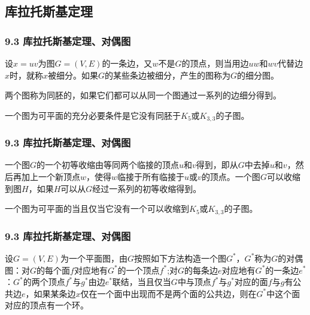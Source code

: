 \documentclass{beamer}
\begin{document}
\begin{CJK}{UTF8}{gbsn}
\section{库拉托斯基定理}
\begin{frame}
  \frametitle{9.3 库拉托斯基定理、对偶图}
  \begin{Def}
    设$x=uv$为图$G=(V,E)$的一条边，又$w$不是$G$的顶点，则当用边$uw$和$wv$代替边$x$时，就称$x$被细分。如果$G$的某些条边被细分，产生的图称为$G$的细分图。
  \end{Def}
  \begin{Def}
    两个图称为同胚的，如果它们都可以从同一个图通过一系列的边细分得到。
  \end{Def}
  \begin{Thm}
    一个图为可平面的充分必要条件是它没有同胚于$K_5$或$K_{3,3}$的子图。
  \end{Thm}
\end{frame}
\begin{frame}
  \frametitle{9.3 库拉托斯基定理、对偶图}
  \begin{Def}
    一个图$G$的一个初等收缩由等同两个临接的顶点$u$和$v$得到，即从$G$中去掉$u$和$v$，然后再加上一个新顶点$w$，使得$w$临接于所有临接于$u$或$v$的顶点。一个图$G$可以收缩到图$H$，如果$H$可以从$G$经过一系列的初等收缩得到。
  \end{Def}
  \begin{Thm}
    一个图为可平面的当且仅当它没有一个可以收缩到$K_5$或$K_{3,3}$的子图。
  \end{Thm}
\end{frame}
\begin{frame}
  \frametitle{9.3 库拉托斯基定理、对偶图}
  \begin{Def}
    设$G=(V,E)$为一个平面图，由$G$按照如下方法构造一个图$G^*$，$G^*$称为$G$的对偶图：对$G$的每个面$f$对应地有$G^*$的一个顶点$f^*$;对$G$的每条边$e$对应地有$G^*$的一条边$e^*$：$G^*$的两个顶点$f^*$与$g^*$由边$e^*$联结，当且仅当$G$中与顶点$f^*$与$g^*$对应的面$f$与$g$有公共边$e$，如果某条边$x$仅在一个面中出现而不是两个面的公共边，则在$G^*$中这个面对应的顶点有一个环。
  \end{Def}
\end{frame}

\end{CJK}
\end{document}

